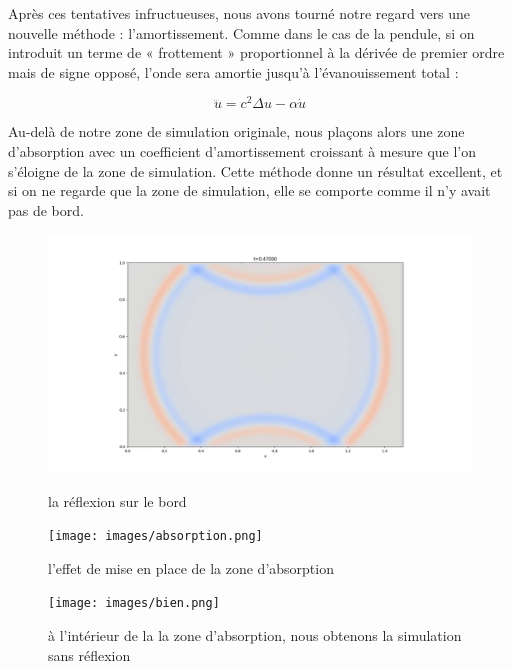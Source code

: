 \documentclass[11pt, a4paper]{article}
\begin{document}
Après ces tentatives infructueuses, nous avons tourné notre regard vers une nouvelle méthode : l'amortissement. Comme dans le cas de la pendule, si on introduit un terme de « frottement » proportionnel à la dérivée de premier ordre mais de signe opposé, l'onde sera amortie jusqu'à l'évanouissement total :

$$
    \ddot{u}=c^2\Delta u - \alpha\dot{u}
$$

Au-delà de notre zone de simulation originale, nous plaçons alors une zone d'absorption avec un coefficient d'amortissement croissant à mesure que l'on s'éloigne de la zone de simulation. Cette méthode donne un résultat excellent, et si on ne regarde que la zone de simulation, elle se comporte comme il n'y avait pas de bord.

\begin{figure}[htbp]
    \centering
    \begin{minipage}[t]{0.48\textwidth}
        \centering
        \includegraphics[width=\textwidth]{images/réflexion.png}
        \caption{la réflexion sur le bord}
        \label{réflexion}
    \end{minipage}
    \hfill
    \begin{minipage}[t]{0.48\textwidth}
        \centering
        \texttt{[image: images/absorption.png]}
        \caption{l'effet de mise en place de la zone d'absorption}
        \label{absorption}
    \end{minipage}
    \hfill
    \begin{minipage}[t]{0.48\textwidth}
        \centering
        \texttt{[image: images/bien.png]}
        \caption{à l'intérieur de la la zone d'absorption, nous obtenons la simulation sans réflexion}
        \label{bien}
    \end{minipage}
\end{figure}
\end{document}
